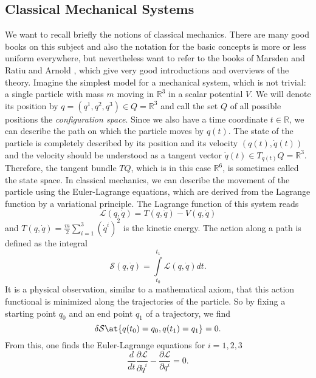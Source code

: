 \subsection{Classical Mechanical Systems}
\label{subsec:chap2_Classical}
We want to recall briefly the notions of classical mechanics. There are many 
good books on this subject and also the notation for the basic concepts is more or 
less uniform everywhere, but nevertheless want to refer to the books of Marsden 
and Ratiu \cite{marsden.ratiu:1999a} and Arnold \cite{arnold:1989a}, which give 
very good introductions and overviews of the theory.
Imagine the simplest model for a mechanical system, which is not trivial: a 
single particle with mass $m$ moving in $\mathbb{R}^3$ in a scalar potential $V$. 
We will denote its position by $q = (q^1, q^2, q^3) \in Q = \mathbb{R}^3$ and call 
the set $Q$ of all possible positions the \emph{configuration space}. Since we 
also have a time coordinate $t \in \mathbb{R}$, we can describe the path on which 
the particle moves by $q(t)$. The state of the particle is completely described 
by its position and its velocity $(q(t), \dot q(t))$ and the velocity should be 
understood as a tangent vector $\dot q(t) \in T_{q(t)}Q = \mathbb{R}^3$. 
Therefore, the tangent bundle $TQ$, which is in this case $\mathbb{R}^6$, is 
sometimes called the state space. In classical mechanics, we can describe the 
movement of the particle using the Euler-Lagrange equations, which are derived 
from the Lagrange function by a variational principle. The Lagrange function of 
this system reads
\begin{equation*}
	\mathcal{L}(q, \dot q)
	=
	T(q, \dot q) - V(q, \dot q)
\end{equation*}
and $T(q, \dot q) = \frac{m}{2}  \sum_{i=1}^3 \left( \dot{q}^i \right)^2$ is the 
kinetic energy. The action along a path is defined as the integral
\begin{equation*}
	\mathcal{S}(q, \dot q)
	=
	\int\limits_{t_0}^{t_1}
	\mathcal{L}(q, \dot q)
	dt.
\end{equation*}
It is a physical observation, similar to a mathematical axiom, that this action 
functional is minimized along the trajectories of the particle. So by fixing a 
starting point $q_0$ and an end point $q_1$ of a trajectory, we find
\begin{equation*}
	\delta \mathcal{S}
	\at{q(t_0) = q_0, q(t_1) = q_1}
	=
	0.
\end{equation*}
From this, one finds the Euler-Lagrange equations for $i = 1, 2, 3$
\begin{equation*}
	\frac{d}{dt} 
	\frac{\partial \mathcal{L}}{\partial \dot q^i}
	-
	\frac{\partial \mathcal{L}}{\partial q^i}
	=
	0.
\end{equation*}
